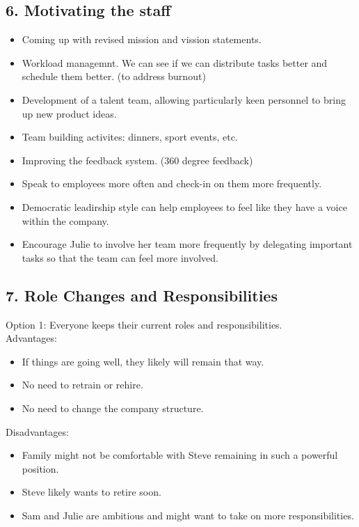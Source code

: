 \documentclass[a4paper,10pt]{article}
\begin{document}
\subsection{6. Motivating the staff}

\begin{itemize}
    \item Coming up with revised mission and vission statements.
    \item Workload managemnt. We can see if we can distribute tasks better and schedule them better. (to address burnout)
    \item Development of a talent team, allowing particularly keen personnel to bring up new product ideas.
    \item Team building activites: dinners, sport events, etc.
    \item Improving the feedback system. (360 degree feedback)
    \item Speak to employees more often and check-in on them more frequently.
    \item Democratic leadirship style can help employees to feel like they have a voice within the company.
    \item Encourage Julie to involve her team more frequently by delegating important tasks so that the team can feel more involved.
\end{itemize}

\subsection{7. Role Changes and Responsibilities}

Option 1: Everyone keeps their current roles and responsibilities.\\

Advantages:\\
\begin{itemize}
    \item If things are going well, they likely will remain that way.
    \item No need to retrain or rehire.
    \item No need to change the company structure.
\end{itemize}

Disadvantages:\\
\begin{itemize}
    \item Family might not be comfortable with Steve remaining in such a powerful position.
    \item Steve likely wants to retire soon.
    \item Sam and Julie are ambitious and might want to take on more responsibilities.
\end{itemize}
\end{document}

